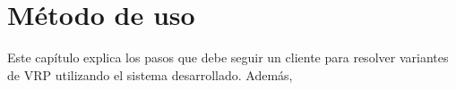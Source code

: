 \chapter{Método de uso}\label{chapter:Tutorial}

Este capítulo explica los pasos que debe seguir un cliente para resolver variantes de VRP utilizando el sistema desarrollado. Además, 

 




